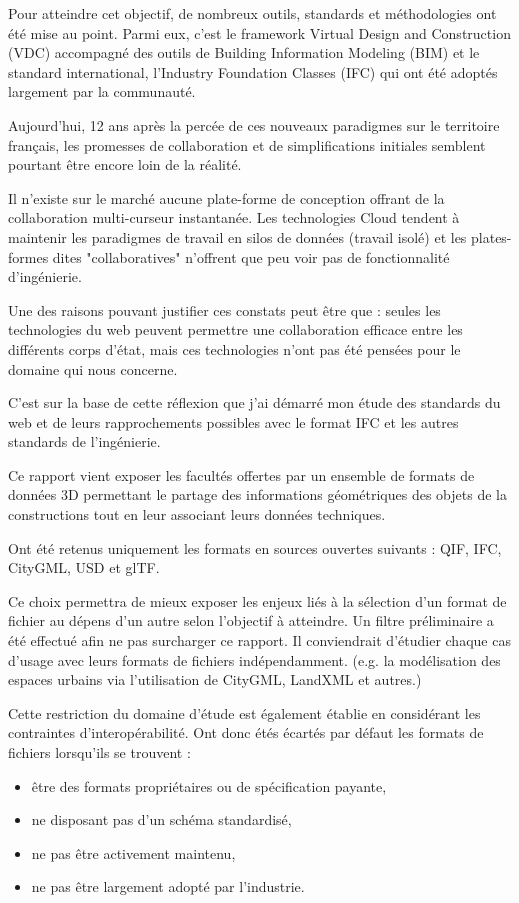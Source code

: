 \documentclass[a4paper,12pt]{article}
\begin{document}
Pour atteindre cet objectif, de nombreux outils, standards et méthodologies ont été mise au point. Parmi eux, c'est le framework Virtual Design and Construction  (VDC) \autocite{brittanygielReturnInvestmentAnalysis2013} accompagné des outils de Building Information Modeling (BIM) \autocite{burcinbecerik-gerberPERCEIVEDVALUEBUILDING2010} et le standard international, l'Industry Foundation Classes (IFC) \autocite{yacinerezguiGOVERNANCEAPPROACHBIM2013} qui ont été adoptés largement par la communauté.

Aujourd'hui, 12 ans après la percée de ces nouveaux paradigmes sur le territoire français, les promesses de collaboration et de simplifications initiales semblent pourtant être encore loin de la réalité.

Il n'existe sur le marché aucune plate-forme de conception offrant de la collaboration multi-curseur instantanée. Les technologies Cloud tendent à maintenir les paradigmes de travail en silos de données (travail isolé) et les plates-formes dites "collaboratives" n'offrent que peu voir pas de fonctionnalité d'ingénierie. 

Une des raisons pouvant justifier ces constats peut être que : seules les technologies du web peuvent permettre une collaboration efficace entre les différents corps d'état, mais ces technologies n'ont pas été pensées pour le domaine qui nous concerne.

C'est sur la base de cette réflexion que j'ai démarré mon étude des standards du web et de leurs rapprochements possibles avec le format IFC et les autres standards de l'ingénierie.

Ce rapport vient exposer les facultés offertes par un ensemble de formats de données 3D permettant le partage des informations géométriques des objets de la constructions tout en leur associant leurs données techniques. 

Ont été retenus uniquement les formats en sources ouvertes suivants : QIF, IFC, CityGML, USD et glTF.

Ce choix permettra de mieux exposer les enjeux liés à la sélection d'un format de fichier au dépens d'un autre selon l'objectif à atteindre. Un filtre préliminaire a été effectué afin ne pas surcharger ce rapport. Il conviendrait d'étudier chaque cas d'usage avec leurs formats de fichiers indépendamment. (e.g. la modélisation des espaces urbains via l'utilisation de CityGML, LandXML et autres.)

Cette restriction du domaine d'étude est également établie en considérant les contraintes d'interopérabilité.
Ont donc étés écartés par défaut les formats de fichiers lorsqu'ils se trouvent :
\begin{itemize}
\item être des formats propriétaires ou de spécification payante,
\item ne disposant pas d'un schéma standardisé,
\item ne pas être activement maintenu,
\item ne pas être largement adopté par l'industrie.
\end{itemize}
\end{document}
